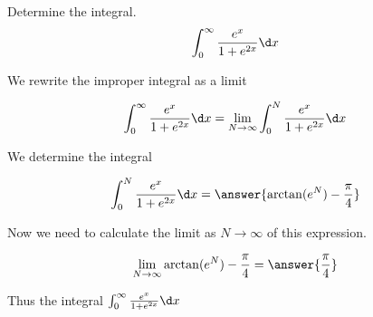 \documentclass{ximera}
\author{Jason Miller}
\begin{document}
\begin{exercise}
Determine the integral.
\[
\int_{0}^{\infty} \frac{e^{x}}{1+e^{2x}} \d x
\]

We  rewrite the improper integral as a limit

\[
\int_{0}^{\infty}\frac{e^{x}}{1+e^{2x}} \d x=\lim_{N \to \infty} \int_{0}^{N} \frac{e^{x}}{1+e^{2x}} \d x
\]

We determine the integral

\[
\int_{0}^{N} \frac{e^{x}}{1+e^{2x}} \d x= \answer{\arctan(e^{N}) - \frac{\pi}{4} }
\]


\begin{exercise}
Now we need to calculate the limit as $N \to \infty$ of this expression. 

\[
\lim_{N \to \infty} \arctan(e^{N})-\frac{\pi}{4} =\answer{ \frac{\pi}{4}}
\]

\begin{exercise}
Thus the integral $\int_{0}^{\infty} \frac{e^{x}}{1+e^{2x}} \d x$

\begin{multipleChoice}
\end{multipleChoice}




\end{exercise}
\end{exercise}
\end{exercise}
\end{document}
